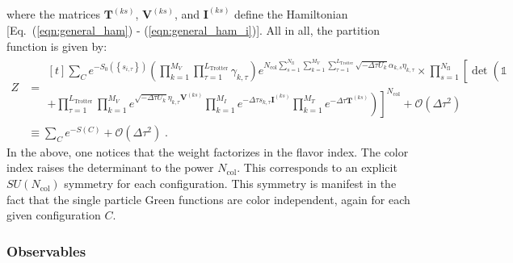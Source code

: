 where the matrices $\bm{T}^{(ks)}$,  $\bm{V}^{(ks)}$, and  $\bm{I}^{(ks)}$ define the Hamiltonian [Eq.~(\ref{eqn:general_ham}) - (\ref{eqn:general_ham_i})].
All in all, the partition function is given by:
\begin{align}\label{eqn:partition_2}
    Z  &=   \begin{multlined}[t]   \sum_{C}   e^{-S_0 \left( \left\{ s_{i,\tau} \right\}  \right) }     \left( \prod_{k=1}^{M_V} \prod_{\tau=1}^{L_{\mathrm{Trotter}}} \gamma_{k,\tau} \right)
    e^{ N_{\mathrm{col}}\sum\limits_{s=1}^{N_{\mathrm{fl}}} \sum\limits_{k=1}^{M_V} \sum\limits_{\tau = 1}^{L_{\mathrm{Trotter}}}\sqrt{-\Delta \tau U_k}  \alpha_{k,s} \eta_{k,\tau} } 
  \times  \prod_{s=1}^{N_{\mathrm{fl}}}\left[\det\left(  \mathds{1}   \phantom{\prod_{k=1}^{M_V}}   \right. \right. \\
   \left. \left.   + \prod_{\tau=1}^{L_{\mathrm{Trotter}}}   
    \prod_{k=1}^{M_V}   e^{  \sqrt{ -\Delta \tau  U_k} \eta_{k,\tau} {\bm V}^{(ks)} }   \prod_{k=1}^{M_I}   e^{  -\Delta \tau s_{k,\tau}  {\bm I}^{(ks)}}  
     \prod_{k=1}^{M_T}   e^{-\Delta \tau {\bm T}^{(ks)}} 
     \right) \right]^{N_{\mathrm{col}}} + \mathcal{O}(\Delta\tau^{2})  \end{multlined} \nonumber \\ 
     & \equiv  \sum_{C} e^{-S(C) } + \mathcal{O}(\Delta\tau^{2})\;.
\end{align}
In the above, one notices that the weight factorizes in  the flavor index. The color index raises the determinant to the power $N_{\mathrm{col}}$. 
This corresponds to  an explicit $SU(N_{\mathrm{col}})$ symmetry   for each  configuration. This symmetry is manifest in the fact that the single particle  Green functions are color independent, again for each given  configuration $C$.

\subsubsection{Observables}\label{Observables.General}

